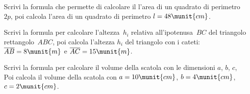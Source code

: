 \begin{esercizio}
\label{ese:8.8}
Scrivi la formula che permette di calcolare il l'area di un quadrato di 
perimetro~\(2p\), poi calcola l'area di un quadrato di perimetro
\(l=48\munit{cm}\).
\end{esercizio}

\begin{esercizio}
\label{ese:8.9}
Scrivi la formula per calcolare l'altezza~\(h_i\) relativa 
all'ipotenusa~\(BC\) del triangolo rettangolo~\(ABC\),
poi calcola l'altezza \(h_i\) del triangolo con i 
cateti:~\(\overline{AB}=8\munit{m}\) e \(\overline{AC}=15\munit{m}\).
\end{esercizio}

\begin{esercizio}
\label{ese:8.10}
Scrivi la formula per calcolare il volume della scatola con le dimensioni 
\(a\), \(b\), \(c\),\\
Poi calcola il volume della scatola con 
\(a=10\munit{cm}\), \(b=4\munit{cm}\), \(c=2\munit{cm}\).

\vspace{.5em}
\end{esercizio}

\pagebreak %

